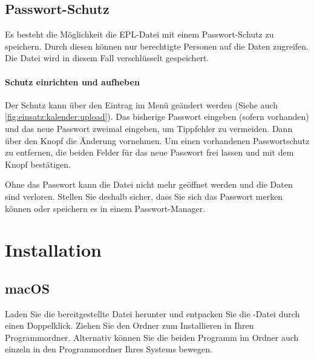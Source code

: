 \begin{neu}
\subsection{Passwort-Schutz}\label{epl:allg:datei:passwort}
Es besteht die Möglichkeit die EPL-Datei mit einem Passwort-Schutz zu speichern.
Durch diesen können nur berechtigte Personen auf die Daten zugreifen.
Die Datei wird in diesem Fall verschlüsselt gespeichert.

\paragraph{Schutz einrichten und aufheben}
Der Schutz kann über den Eintrag  im Menü  geändert werden (Siehe auch \cref{fig:einsatz:kalender:upload}).
Das bisherige Passwort eingeben (sofern vorhanden) und das neue Passwort zweimal eingeben, um Tippfehler zu vermeiden.
Dann über den Knopf  die Änderung vornehmen.
Um einen vorhandenen Passwortschutz zu entfernen,
die beiden Felder für das neue Passwort frei lassen und mit dem Knopf bestätigen.


\begin{hinweis}
  Ohne das Passwort kann die Datei nicht mehr geöffnet werden und die Daten sind verloren.
  Stellen Sie deshalb sicher,
  dass Sie sich das Passwort merken können oder speichern es in einem Passwort-Manager.
\end{hinweis}

\end{neu}

\section{Installation}\label{epl:allg:installation}
\subsection{macOS}
Laden Sie die bereitgestellte Datei herunter und entpacken Sie die -Datei durch einen Doppelklick.
Ziehen Sie den Ordner  zum Installieren in Ihren Programmordner.
Alternativ können Sie die beiden Programm im Ordner  auch einzeln in den Programmordner Ihres Systems bewegen.

